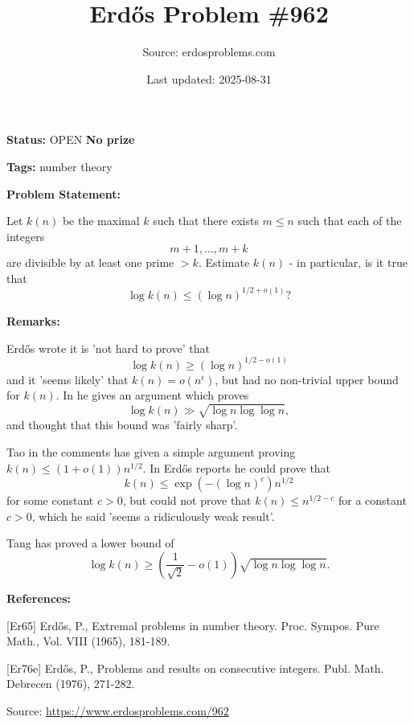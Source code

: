 \documentclass{article}
\title{Erd\H{o}s Problem \#962}
\date{Last updated: 2025-08-31}
\author{Source: erdosproblems.com}
\begin{document}
\maketitle

\noindent\textbf{Status:} OPEN \quad \textbf{No prize}

\noindent\textbf{Tags:} number theory

\medskip
\noindent\textbf{Problem Statement:}

Let $k(n)$ be the maximal $k$ such that there exists $m\leq n$ such that each of the integers\[m+1,\ldots,m+k\]are divisible by at least one prime $>k$. Estimate $k(n)$ - in particular, is it true that\[\log k(n) \leq (\log n)^{1/2+o(1)}?\]

\bigskip
\noindent\textbf{Remarks:}

Erd\H{o}s \cite{Er65} wrote it is 'not hard to prove' that\[\log k(n)\geq (\log n)^{1/2-o(1)}\]and it 'seems likely' that $k(n)=o(n^\epsilon)$, but had no non-trivial upper bound for $k(n)$. In \cite{Er76e} he gives an argument which proves\[\log k(n) \gg \sqrt{\log n\log\log n},\]and thought that this bound was 'fairly sharp'.

Tao in the comments has given a simple argument proving $k(n) \leq (1+o(1))n^{1/2}$. In \cite{Er76e} Erd\H{o}s reports he could prove that\[k(n) \leq \exp(-(\log n)^c)n^{1/2}\]for some constant $c>0$, but could not prove that $k(n) \leq n^{1/2-c}$ for a constant $c>0$, which he said 'seems a ridiculously weak result'. 

Tang has proved a lower bound of\[\log k(n)\geq \left(\frac{1}{\sqrt{2}}-o(1)\right)\sqrt{\log n\log\log n}.\]

\bigskip
\noindent\textbf{References:}

[Er65] Erd\H{o}s, P., Extremal problems in number theory. Proc. Sympos. Pure Math., Vol. VIII (1965), 181-189.
 
 [Er76e] Erd\H{o}s, P., Problems and results on consecutive integers. Publ. Math. Debrecen (1976), 271-282.

\bigskip
\noindent\small{Source: \url{https://www.erdosproblems.com/962}}
\end{document}
